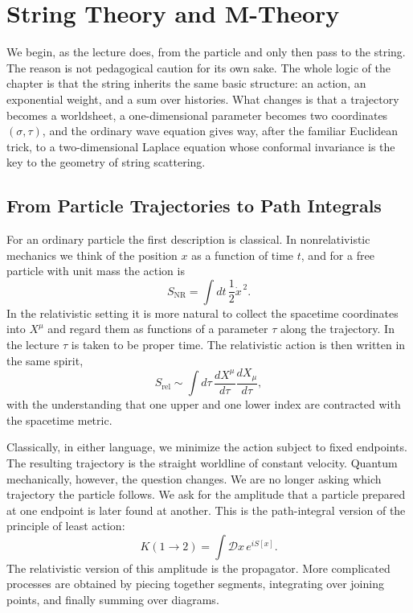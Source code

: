 \chapter{String Theory and M-Theory}

We begin, as the lecture does, from the particle and only then pass to the string. The reason is not pedagogical caution for its own sake. The whole logic of the chapter is that the string inherits the same basic structure: an action, an exponential weight, and a sum over histories. What changes is that a trajectory becomes a worldsheet, a one-dimensional parameter becomes two coordinates \((\sigma,\tau)\), and the ordinary wave equation gives way, after the familiar Euclidean trick, to a two-dimensional Laplace equation whose conformal invariance is the key to the geometry of string scattering.

\section{From Particle Trajectories to Path Integrals}

For an ordinary particle the first description is classical. In nonrelativistic mechanics we think of the position \(x\) as a function of time \(t\), and for a free particle with unit mass the action is
\begin{equation}
S_{\mathrm{NR}}=\int dt\,\frac12 \dot{x}^{\,2}.
\end{equation}
In the relativistic setting it is more natural to collect the spacetime coordinates into \(X^\mu\) and regard them as functions of a parameter \(\tau\) along the trajectory. In the lecture \(\tau\) is taken to be proper time. The relativistic action is then written in the same spirit,
\begin{equation}
S_{\mathrm{rel}}\sim \int d\tau\,\frac{dX^\mu}{d\tau}\frac{dX_\mu}{d\tau},
\end{equation}
with the understanding that one upper and one lower index are contracted with the spacetime metric.

Classically, in either language, we minimize the action subject to fixed endpoints. The resulting trajectory is the straight worldline of constant velocity. Quantum mechanically, however, the question changes. We are no longer asking which trajectory the particle follows. We ask for the amplitude that a particle prepared at one endpoint is later found at another. This is the path-integral version of the principle of least action:
\begin{equation}
K(1\to 2)=\int \mathcal{D}x\,e^{iS[x]}.
\end{equation}
The relativistic version of this amplitude is the propagator. More complicated processes are obtained by piecing together segments, integrating over joining points, and finally summing over diagrams.

